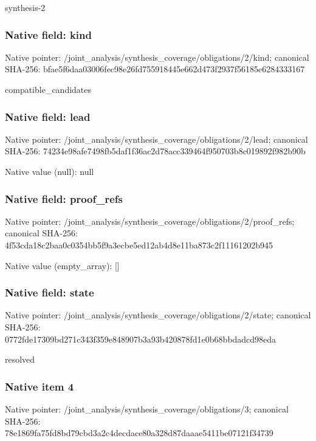 \documentclass[10pt,a4paper]{article}
\begin{document}
\begingroup\raggedright\sloppy synthesis-2\par\endgroup

\subsubsection{Native field: kind}
Native pointer: /joint\_\allowbreak{}analysis/synthesis\_\allowbreak{}coverage/obligations/2/kind; canonical SHA-256: bfae5f6daa03006fec98e26fd755918445e662d473f2937f56185e6284333167

\begingroup\raggedright\sloppy compatible\_\allowbreak{}candidates\par\endgroup

\subsubsection{Native field: lead}
Native pointer: /joint\_\allowbreak{}analysis/synthesis\_\allowbreak{}coverage/obligations/2/lead; canonical SHA-256: 74234e98afe7498fb5daf1f36ac2d78acc339464f950703b8c019892f982b90b

Native value (null): null

\subsubsection{Native field: proof\_\allowbreak{}refs}
Native pointer: /joint\_\allowbreak{}analysis/synthesis\_\allowbreak{}coverage/obligations/2/proof\_\allowbreak{}refs; canonical SHA-256: 4f53cda18c2baa0c0354bb5f9a3ecbe5ed12ab4d8e11ba873c2f11161202b945

Native value (empty\_\allowbreak{}array): []

\subsubsection{Native field: state}
Native pointer: /joint\_\allowbreak{}analysis/synthesis\_\allowbreak{}coverage/obligations/2/state; canonical SHA-256: 0772fde17309bd271c343f359e848907b3a93b420878fd1e0b68bbdadcd98eda

\begingroup\raggedright\sloppy resolved\par\endgroup

\subsubsection{Native item 4}
Native pointer: /joint\_\allowbreak{}analysis/synthesis\_\allowbreak{}coverage/obligations/3; canonical SHA-256: 78e1869fa75fd8bd79cbd3a2c4decdace80a328d87daaae5411be07121f34739
\end{document}
